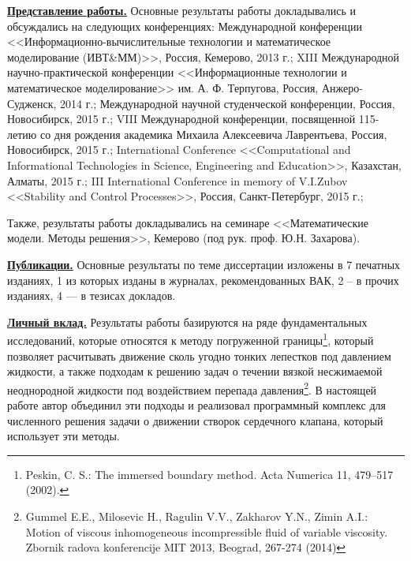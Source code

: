 \underline{\textbf{Представление работы.}}
Основные результаты работы докладывались и обсуждались на следующих конференциях:
Международной конференции <<Информационно-вычислительные технологии и математическое моделирование (ИВТ\&ММ)>>, Россия, Кемерово, 2013 г.;
XIII Международной научно-практической конференции <<Информационные технологии и математическое моделирование>> им. А. Ф. Терпугова, Россия, Анжеро-Судженск, 2014 г.;
Международной научной студенческой конференции, Россия, Новосибирск, 2015 г.;
VIII Международной конференции, посвященной 115-летию со дня рождения академика Михаила Алексеевича Лаврентьева, Россия, Новосибирск, 2015 г.;
International Conference <<Computational and Informational Technologies in Science, Engineering and Education>>, Казахстан, Алматы, 2015 г.;
III International Conference in memory of V.I.Zubov <<Stability and Control Processes>>, Россия, Санкт-Петербург, 2015 г.;

Также, результаты работы докладывались на семинаре <<Математические модели. Методы решения>>, Кемерово (под рук. проф. Ю.Н. Захарова). 

\underline{\textbf{Публикации.}} Основные результаты по теме диссертации изложены в 7 печатных изданиях, 1 из которых изданы в журналах, рекомендованных ВАК, 2 -- в прочих изданиях, 4 --- в тезисах докладов.


\underline{\textbf{Личный вклад.}} Результаты работы базируются на ряде фундаментальных исследований, которые относятся
к методу погруженной границы\footnote{
    Peskin, C. S.: The immersed boundary method. Acta Numerica 11, 479–517 (2002).
}, который позволяет расчитывать движение сколь угодно тонких лепестков под давлением жидкости, а также подходам
к решению задач о течении вязкой несжимаемой неоднородной жидкости под воздействием перепада давления\footnote{
    Gummel E.E., Milosevic H., Ragulin V.V., Zakharov Y.N., Zimin A.I.: Motion of viscous inhomogeneous incompressible fluid of variable viscosity. Zbornik radova konferencije MIT 2013, Beograd, 267-274 (2014)
}. В настоящей работе автор объединил эти подходы и реализовал программный комплекс для
численного решения задачи о движении створок сердечного клапана, который использует эти методы.



